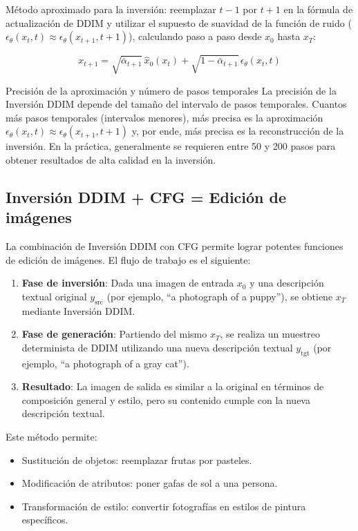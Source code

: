Método aproximado para la inversión: reemplazar $t-1$ por $t+1$ en la fórmula de actualización de DDIM y utilizar el supuesto de suavidad de la función de ruido ($\epsilon_\theta(x_t, t) \approx \epsilon_\theta(x_{t+1}, t+1)$), calculando paso a paso desde $x_0$ hasta $x_T$:

$$
x_{t+1} = \sqrt{\bar\alpha_{t+1}}\,\hat{x}_0(x_t) + \sqrt{1-\bar\alpha_{t+1}}\,\epsilon_\theta(x_t, t)
$$

\begin{knowledgebox}{Precisión de la aproximación y número de pasos temporales}
La precisión de la Inversión DDIM depende del tamaño del intervalo de pasos temporales. Cuantos más pasos temporales (intervalos menores), más precisa es la aproximación $\epsilon_\theta(x_t, t) \approx \epsilon_\theta(x_{t+1}, t+1)$ y, por ende, más precisa es la reconstrucción de la inversión. En la práctica, generalmente se requieren entre 50 y 200 pasos para obtener resultados de alta calidad en la inversión.
\end{knowledgebox}

\subsection{Inversión DDIM + CFG = Edición de imágenes}

La combinación de Inversión DDIM con CFG permite lograr potentes funciones de edición de imágenes. El flujo de trabajo es el siguiente:

\begin{enumerate}
    \item \textbf{Fase de inversión}: Dada una imagen de entrada $x_0$ y una descripción textual original $y_{\text{src}}$ (por ejemplo, ``a photograph of a puppy''), se obtiene $x_T$ mediante Inversión DDIM.
    \item \textbf{Fase de generación}: Partiendo del mismo $x_T$, se realiza un muestreo determinista de DDIM utilizando una nueva descripción textual $y_{\text{tgt}}$ (por ejemplo, ``a photograph of a gray cat'').
    \item \textbf{Resultado}: La imagen de salida es similar a la original en términos de composición general y estilo, pero su contenido cumple con la nueva descripción textual.
\end{enumerate}

Este método permite:
\begin{itemize}
    \item Sustitución de objetos: reemplazar frutas por pasteles.
    \item Modificación de atributos: poner gafas de sol a una persona.
    \item Transformación de estilo: convertir fotografías en estilos de pintura específicos.
\end{itemize}

